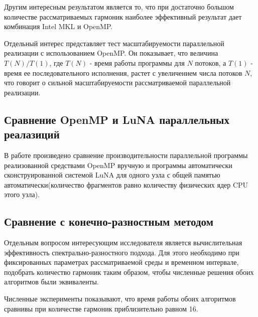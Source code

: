 Другим интересным результатом является то, что при достаточно большом количестве рассматриваемых гармоник
наиболее эффективный результат дает комбинация Intel MKL и OpenMP.


Отдельный интерес представляет тест масштабируемости параллельной реализации с использованием OpenMP. Он показывает, что величина $T(N)/T(1)$, где $T(N)$ - время работы программы для $N$ потоков, а $T(1)$ - время ее последовательного исполнения, растет с увеличением числа потоков $N$, что говорит о сильной масштабируемости рассматриваемой параллельной реализации.


\subsection{Сравнение OpenMP и LuNA параллельных реалазиций}
В работе произведено сравнение производительности параллельной программы реализованной средствами OpenMP вручную
и программы автоматически сконструированной системой LuNA для одного узла с общей памятью автоматически(количество фрагментов
равно количеству физических ядер CPU этого узла).

\subsection{Сравнение с конечно-разностным методом}

Отдельным вопросом интересующим исследователя является вычислительная эффективность спектрально-разностного подхода.
Для этого необходимо при фиксированных параметрах рассматриваемой среды и временном интервале, подобрать количество гармоник таким образом,
чтобы численные решения обоих алгоритмов были эквиваленты.


Численные эксперименты показывают, что время работы обоих алгоритмов сравнивы при количестве гармоник приблизительно равном 16.


\clearpage
